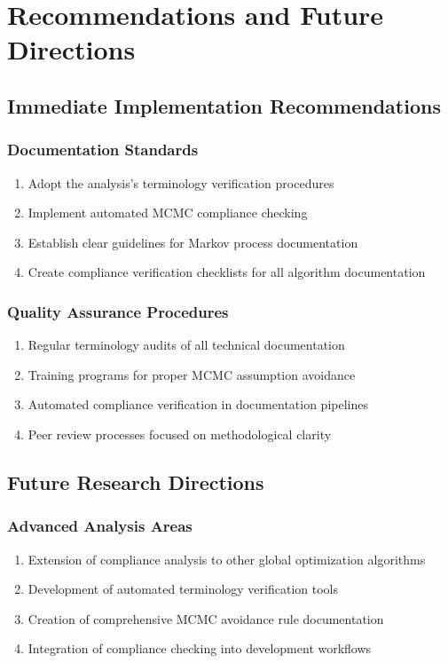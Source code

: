 \documentclass[11pt,a4paper]{article}
\begin{document}
\section{Recommendations and Future Directions}

\subsection{Immediate Implementation Recommendations}

\subsubsection{Documentation Standards}
\begin{enumerate}
\item Adopt the analysis's terminology verification procedures
\item Implement automated MCMC compliance checking
\item Establish clear guidelines for Markov process documentation
\item Create compliance verification checklists for all algorithm documentation
\end{enumerate}

\subsubsection{Quality Assurance Procedures}
\begin{enumerate}
\item Regular terminology audits of all technical documentation
\item Training programs for proper MCMC assumption avoidance
\item Automated compliance verification in documentation pipelines
\item Peer review processes focused on methodological clarity
\end{enumerate}

\subsection{Future Research Directions}

\subsubsection{Advanced Analysis Areas}
\begin{enumerate}
\item Extension of compliance analysis to other global optimization algorithms
\item Development of automated terminology verification tools
\item Creation of comprehensive MCMC avoidance rule documentation
\item Integration of compliance checking into development workflows
\end{enumerate}
\end{document}
